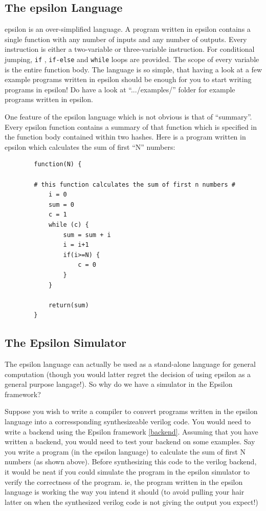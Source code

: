\documentclass[titlepage]{article}
\begin{document}
\subsection{The epsilon Language}
    epsilon is an over-simplified language. A program written in epsilon contains a single function with any number of inputs
    and any number of outputs. Every instruction is either a two-variable or three-variable instruction.
    For conditional jumping, \texttt{if} ,  \texttt{if-else} and \texttt{while} loops are provided. The scope of every variable is the entire function body.
    The language is so simple, that having a look at a few example programs written in epsilon should be enough for you to start writing
    programs in epsilon! Do have a look at \textsf{``.../examples/''} folder for example programs written in epsilon.

    One feature of the epsilon language which is not obvious is that of  ``summary''. Every epsilon function contains a summary of that function which is specified in the function body contained within two hashes.
    Here is a program written in epsilon which calculates the sum of first ``N'' numbers:
    \begin{verbatim}
        function(N) {
            
        # this function calculates the sum of first n numbers #
            i = 0
            sum = 0
            c = 1
            while (c) {
                sum = sum + i
                i = i+1
                if(i>=N) {
                    c = 0
                }
            }
            
            return(sum)
        }
    \end{verbatim}
    
    \subsection{The Epsilon Simulator}
    \label{simulator}
    The epsilon language can actually be used as a stand-alone language for general computation (though you would latter regret
    the decision of using epsilon as a general purpose langage!). So why do we have a simulator in the Epsilon framework?


    Suppose you wish to write a compiler to convert programs written in the epsilon language into a corressponding 
    synthesizeable verilog code. You would need to write a backend using the Epsilon framework \ref{backend}. Assuming that you have 
    written a backend, you would need to test your backend on some examples. Say you write a program (in the epsilon language) 
    to calculate
    the sum of first N numbers (as shown above). Before synthesizing this code to the verilog backend, it would be neat if you could simulate the program
    in the epsilon simulator to verify the correctness of the program. ie, the program written in the epsilon language is working the way you intend it should (to avoid pulling your hair latter on when the synthesized verilog code is not giving the output you expect!)
\end{document}
